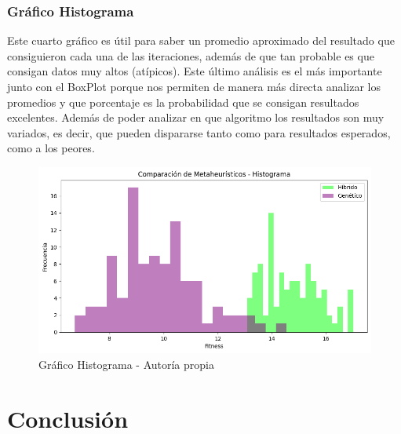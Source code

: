 \documentclass{article}
\begin{document}
\subsubsection{Gráfico Histograma}

Este cuarto gráfico es útil para saber un promedio aproximado del resultado que consiguieron cada una de las iteraciones, además de que tan probable es que consigan datos muy altos (atípicos). \newline
Este último análisis es el más importante junto con el BoxPlot porque nos permiten de manera más directa analizar los promedios y que porcentaje es la probabilidad que se consigan resultados excelentes. Además de poder analizar en que algoritmo los resultados son muy variados, es decir, que pueden dispararse tanto como para resultados esperados, como a los peores.

\begin{figure}[H]
    \centering
    \includegraphics[width=1\linewidth]{imagenes/grafico_histograma.png}
    \caption{Gráfico Histograma - Autoría propia}
    \label{fig:enter-label}
\end{figure}

\section{Conclusión}
\end{document}
